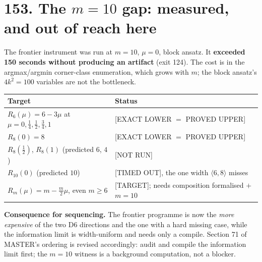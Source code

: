 \documentclass[9pt,twocolumn]{article}
\newcommand{\eclass}[1]{\textsf{[#1]}}
\renewcommand{\_}{\CIGunderscore\allowbreak}
\begin{document}
\section*{153. The $m=10$ gap: measured, and out of reach here}
The frontier instrument was run at $m=10$, $\mu=0$, block ansatz. It \textbf{exceeded 150 seconds without producing an artifact} (exit 124). The cost is in the argmax/argmin corner-class enumeration, which grows with $m$; the block ansatz's $4k^2=100$ variables are not the bottleneck.
\begin{center}\scriptsize
\begin{tabularx}{0.98\columnwidth}{X X}
\toprule
Target & Status\\
\midrule
$R_6(\mu)=6-3\mu$ at $\mu=0,\tfrac14,\tfrac12,\tfrac34,1$ & \eclass{EXACT LOWER $=$ PROVED UPPER}\\
$R_8(0)=8$ & \eclass{EXACT LOWER $=$ PROVED UPPER}\\
$R_8(\tfrac12)$, $R_8(1)$ (predicted $6$, $4$) & \eclass{NOT RUN}\\
$R_{10}(0)$ (predicted $10$) & \eclass{TIMED OUT}, the one width $\langle6,8\rangle$ misses\\
$R_m(\mu)=m-\tfrac m2\mu$, even $m\ge6$ & \eclass{TARGET}; needs composition formalised $+$ $m=10$\\
\bottomrule
\end{tabularx}
\end{center}
\textbf{Consequence for sequencing.} The frontier programme is now the \emph{more expensive} of the two D6 directions and the one with a hard missing case, while the information limit is width-uniform and needs only a compile. Section 71 of MASTER's ordering is revised accordingly: audit and compile the information limit first; the $m=10$ witness is a background computation, not a blocker.
\end{document}
